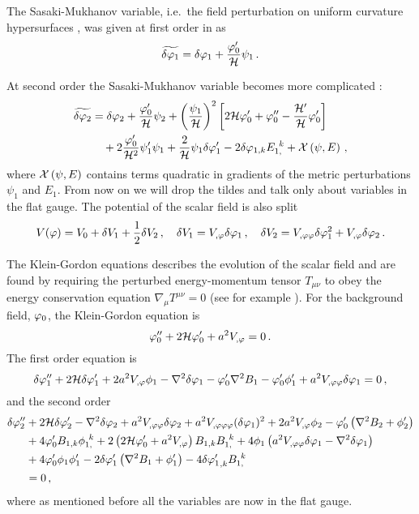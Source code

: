 The Sasaki-Mukhanov variable, i.e.\ the field perturbation on uniform curvature
hypersurfaces \cite{Sasaki:1986hm,Mukhanov:1988jd}, was given at first order in
 as
%  
\begin{equation}
\label{eq:Q1I-num}
\widetilde{\delta\varphi_{1}}=\delta\varphi_{1}+\frac{\varphi_{0}'}{\mathcal{H}}\psi_1\,.
\end{equation}
% 

% 
At second order the Sasaki-Mukhanov variable becomes more complicated
\cite{Malik:2005cy,Malik:2003mv}:
% 
\begin{align}
\label{eq:Q2I-num}
\widetilde{\delta\varphi_{2}} &= \delta\varphi_{2}+\frac{\varphi_{0}'}{\mathcal{H}}\psi_2
+\left(\frac{\psi_1}{\mathcal{H}}\right)^2\left[
2\mathcal{H}\varphi_{0}'+\varphi_{0}''-\frac{\mathcal{H}'}{\mathcal{H}}\varphi_{0}'\right] \nonumber\\
& \quad +2\frac{\varphi_{0}'}{\mathcal{H}^2}\psi_1'\psi_1+\frac{2}{\mathcal{H}}\psi_1\delta\varphi_{1}'
-2\delta\varphi_{1,k}E_{1,}^{~k}
+{\cal{X}}\left(\psi,E\right)\,,
\end{align}
% 
where ${\cal{X}}\left(\psi,E\right)$ contains terms quadratic in
gradients of the metric perturbations $\psi_1$ and $E_1$. From now on we will
drop the tildes and talk only about variables in the flat gauge.
The potential of the scalar field is also split
% 
\begin{equation}
 V(\varphi) = V_{0} + \delta V_{1} + \frac{1}{2}\delta V _{2}\,,\quad
 \delta V_{1} = V_{,\varphi} \delta\varphi_{1} \,,\quad
 \delta V_{2} = V_{,\varphi\varphi} \delta\varphi_{1}^2 + V_{,\varphi}\delta\varphi_{2} \,.
\end{equation}
% 


The Klein-Gordon equations describes the evolution of the scalar field and are
found by requiring the perturbed energy-momentum tensor $T_{\mu\nu}$ to obey the
energy conservation equation $\nabla_\mu T^{\mu\nu}=0$ (see for example
). For the
background field, $\varphi_0$, the Klein-Gordon equation is 
%
\begin{equation}
\label{eq:KGback-num}
\varphi_{0}''+2\mathcal{H}\varphi_{0}'+a^2 V_{,\varphi} = 0\,.   
\end{equation}
%
% 
% 
The first order equation is
%
\begin{equation}
\label{eq:KGflatsingle-num}
\delta\varphi_{1}''+2\mathcal{H}\delta\varphi_{1}'+2a^2 V_{,\varphi} \phi_1
-\nabla^2\delta\varphi_{1}-\varphi_{0}'\nabla^2 B_1
-\varphi_{0}'\phi'_1 + a^2 V_{,\varphi\varphi} \delta\varphi_{1}
=0\,,
\end{equation}
%
and the second order
%
\begin{align}
\label{eq:KG2flatsingle-num}
\dvp2'' &+ 2\H\dvp2'-\nabla^2\dvp2+a^2 \Upp \dvp2
+ a^2 \Uppp (\dvp1)^2 +2a^2 \Uphi \phi_2
-\vp_{0}'\left(\nabla^2 B_2+\phi_2'\right)\nonumber\\
%
&+ 4\vp_{0}' B_{1,k}\phi_{1,}^{~k}
+2\left(2\H\vp_{0}'+a^2 \Uphi\right) B_{1,k}B_{1,}^{~k}
+4\phi_1\left(a^2 \Upp \dvp1-\nabla^2\dvp1\right) \nonumber\\
&+ 4\vp_{0}'\phi_1\phi_1'
-2\dvp1'\left(\nabla^2 B_1+\phi_1'\right)-4{\dvp1'}_{,k}B_{1,}^{~k} \nonumber \\
&= 0\,,
\end{align}
% 
where as mentioned before all the variables are now in the flat gauge.


